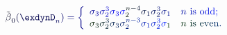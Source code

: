 \documentclass[12pt]{article}
\begin{document}
\makeatletter
\renewcommand*{\@textcolor}[3]{%
  \protect\leavevmode
  \begingroup
    \color#1{#2}#3%
  \endgroup
}
\makeatother
\begin{displaymath}
{\mathcolor[RGB]{0,0,15}{\tilde { \mathcolor[RGB]{0,0,30}{\beta} } }} _ { \mathcolor[RGB]{0,0,45}{0} } \mathcolor[RGB]{0,0,60}{(} \mathcolor[RGB]{0,0,75}{\exdynD} _ { \mathcolor[RGB]{0,0,90}{n} } \mathcolor[RGB]{0,0,105}{)} \mathcolor[RGB]{0,0,120}{=} \mathcolor[RGB]{0,0,135}{\left\{} \begin{array} {ll} { \mathcolor[RGB]{0,0,150}{\sigma} _ { \mathcolor[RGB]{0,0,165}{3} } \mathcolor[RGB]{0,0,180}{\sigma} _ { \mathcolor[RGB]{0,0,195}{2} } ^ { \mathcolor[RGB]{0,0,210}{3} } \mathcolor[RGB]{0,0,225}{\sigma} _ { \mathcolor[RGB]{0,0,240}{3} } \mathcolor[RGB]{0,0,255}{\sigma} _ { \mathcolor[RGB]{0,15,0}{2} } ^ { \mathcolor[RGB]{0,15,15}{n} \mathcolor[RGB]{0,15,30}{-} \mathcolor[RGB]{0,15,45}{4} } \mathcolor[RGB]{0,15,60}{\sigma} _ { \mathcolor[RGB]{0,15,75}{1} } \mathcolor[RGB]{0,15,90}{\sigma} _ { \mathcolor[RGB]{0,15,105}{2} } ^ { \mathcolor[RGB]{0,15,120}{3} } \mathcolor[RGB]{0,15,135}{\sigma} _ { \mathcolor[RGB]{0,15,150}{1} } } & { \mathcolor[RGB]{0,15,165}{n} \mathrm { ~ \mathcolor[RGB]{0,15,180}{i} \mathcolor[RGB]{0,15,195}{s} ~ \mathcolor[RGB]{0,15,210}{o} \mathcolor[RGB]{0,15,225}{d} \mathcolor[RGB]{0,15,240}{d} } \mathcolor[RGB]{0,15,255}{;} } \\ { \mathcolor[RGB]{0,30,0}{\sigma} _ { \mathcolor[RGB]{0,30,15}{3} } \mathcolor[RGB]{0,30,30}{\sigma} _ { \mathcolor[RGB]{0,30,45}{2} } ^ { \mathcolor[RGB]{0,30,60}{3} } \mathcolor[RGB]{0,30,75}{\sigma} _ { \mathcolor[RGB]{0,30,90}{3} } \mathcolor[RGB]{0,30,105}{\sigma} _ { \mathcolor[RGB]{0,30,120}{2} } ^ { \mathcolor[RGB]{0,30,135}{n} \mathcolor[RGB]{0,30,150}{-} \mathcolor[RGB]{0,30,165}{3} } \mathcolor[RGB]{0,30,180}{\sigma} _ { \mathcolor[RGB]{0,30,195}{1} } \mathcolor[RGB]{0,30,210}{\sigma} _ { \mathcolor[RGB]{0,30,225}{2} } ^ { \mathcolor[RGB]{0,30,240}{3} } \mathcolor[RGB]{0,30,255}{\sigma} _ { \mathcolor[RGB]{0,45,0}{1} } } & { \mathcolor[RGB]{0,45,15}{n} \mathrm { ~ \mathcolor[RGB]{0,45,30}{i} \mathcolor[RGB]{0,45,45}{s} ~ \mathcolor[RGB]{0,45,60}{e} \mathcolor[RGB]{0,45,75}{v} \mathcolor[RGB]{0,45,90}{e} \mathcolor[RGB]{0,45,105}{n} } \mathcolor[RGB]{0,45,120}{.} } \end{array} \mathcolor[RGB]{0,45,135}{\right.}
\end{displaymath}
\end{document}
